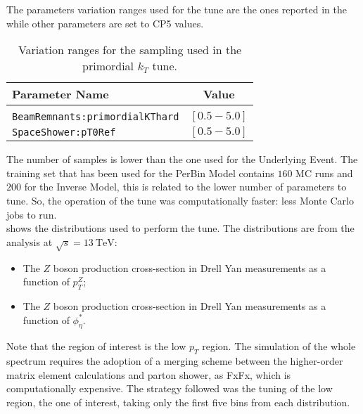 
The parameters variation ranges used for the tune are the ones reported in the  while other parameters are set to CP5 values.



\begin{table}[!htb]
\centering
\begin{tabular}{l | c }
Parameter Name & Value \\ 
\hline \hline
\\[-0.85em]
	\texttt{BeamRemnants:primordialKThard} & $[0.5 - 5.0]$\\[2pt]
	\texttt{SpaceShower:pT0Ref} & $[0.5 - 5.0]$\\
\end{tabular}
\caption{Variation ranges for the sampling used in the primordial $k_T$ tune.}
\label{table:primordialkT_variations}
\end{table} 

The number of samples is lower than the one used for the Underlying Event. The training set that has been used for the PerBin Model contains $160$ MC runs and $200$ for the Inverse Model, this is related to the lower number of parameters to tune. So, the operation of the tune was computationally faster: less Monte Carlo jobs to run.
\\
 shows the distributions used to perform the tune. The distributions  are from the \cite{ZpT_distributions} analysis at $\sqrt{s}=13\ \mathrm{TeV}$:
\begin{itemize}
	\item The $Z$ boson production cross-section in Drell Yan measurements as a function of $p_T^Z$;
	\item The $Z$ boson production cross-section in Drell Yan measurements as a function of $\phi_\eta^*$.
\end{itemize}

\noindent Note that the region of interest is the low $p_T$ region. The simulation of the whole spectrum requires the adoption of a merging scheme between the higher-order matrix element calculations and parton shower, as FxFx, which is computationally expensive. The strategy followed was the tuning of the low region, the one of interest, taking only the first five bins from each distribution.  


\medskip

